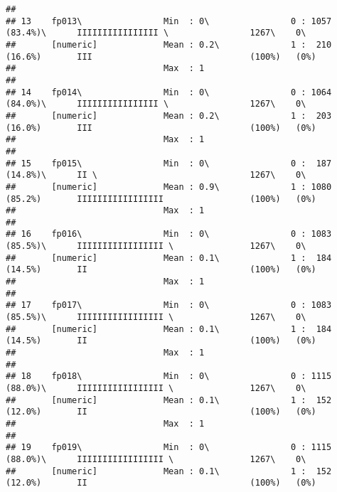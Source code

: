 \documentclass[]{article}
\begin{document}
\begin{verbatim}
## 
## 13    fp013\                Min  : 0\                0 : 1057 (83.4%)\      IIIIIIIIIIIIIIII \                1267\    0\       
##       [numeric]             Mean : 0.2\              1 :  210 (16.6%)       III                               (100%)   (0%)     
##                             Max  : 1                                                                                            
## 
## 14    fp014\                Min  : 0\                0 : 1064 (84.0%)\      IIIIIIIIIIIIIIII \                1267\    0\       
##       [numeric]             Mean : 0.2\              1 :  203 (16.0%)       III                               (100%)   (0%)     
##                             Max  : 1                                                                                            
## 
## 15    fp015\                Min  : 0\                0 :  187 (14.8%)\      II \                              1267\    0\       
##       [numeric]             Mean : 0.9\              1 : 1080 (85.2%)       IIIIIIIIIIIIIIIII                 (100%)   (0%)     
##                             Max  : 1                                                                                            
## 
## 16    fp016\                Min  : 0\                0 : 1083 (85.5%)\      IIIIIIIIIIIIIIIII \               1267\    0\       
##       [numeric]             Mean : 0.1\              1 :  184 (14.5%)       II                                (100%)   (0%)     
##                             Max  : 1                                                                                            
## 
## 17    fp017\                Min  : 0\                0 : 1083 (85.5%)\      IIIIIIIIIIIIIIIII \               1267\    0\       
##       [numeric]             Mean : 0.1\              1 :  184 (14.5%)       II                                (100%)   (0%)     
##                             Max  : 1                                                                                            
## 
## 18    fp018\                Min  : 0\                0 : 1115 (88.0%)\      IIIIIIIIIIIIIIIII \               1267\    0\       
##       [numeric]             Mean : 0.1\              1 :  152 (12.0%)       II                                (100%)   (0%)     
##                             Max  : 1                                                                                            
## 
## 19    fp019\                Min  : 0\                0 : 1115 (88.0%)\      IIIIIIIIIIIIIIIII \               1267\    0\       
##       [numeric]             Mean : 0.1\              1 :  152 (12.0%)       II                                (100%)   (0%)     

\end{verbatim}
\end{document}
